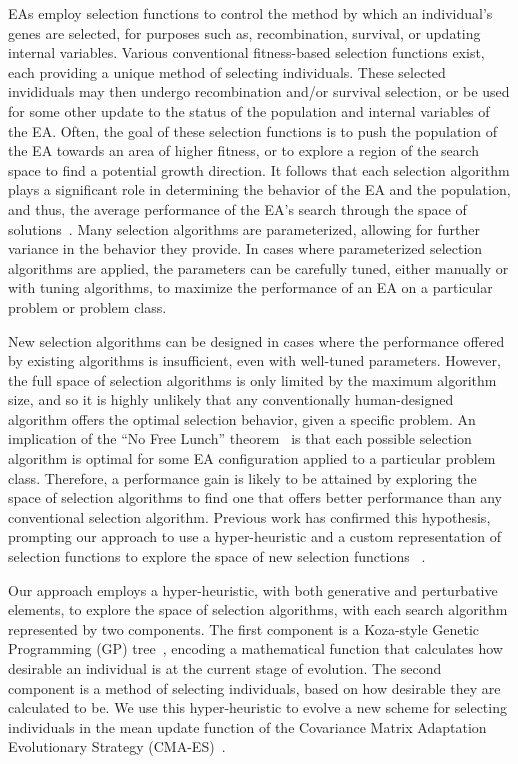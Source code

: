 \documentclass[sigconf]{acmart}
\begin{document}
EAs employ selection functions to control the method by which an individual's genes are selected, for purposes such as, recombination, survival, or updating internal variables. Various conventional fitness-based selection functions exist, each providing a unique method of selecting individuals. These selected invididuals may then undergo recombination and/or survival selection, or be used for some other update to the status of the population and internal variables of the EA. Often, the goal of these selection functions is to push the population of the EA towards an area of higher fitness, or to explore a region of the search space to find a potential growth direction. It follows that each selection algorithm plays a significant role in determining the behavior of the EA and the population, and thus, the average performance of the EA's search through the space of solutions~\citep{woodward2010metaBias}. Many selection algorithms are parameterized, allowing for further variance in the behavior they provide. In cases where parameterized selection algorithms are applied, the parameters can be carefully tuned, either manually or with tuning algorithms, to maximize the performance of an EA on a particular problem or problem class.

New selection algorithms can be designed in cases where the performance offered by existing algorithms is insufficient, even with well-tuned parameters. However, the full space of selection algorithms is only limited by the maximum algorithm size, and so it is highly unlikely that any conventionally human-designed algorithm offers the optimal selection behavior, given a specific problem. An implication of the ``No Free Lunch'' theorem~\citep{wolpert1995noFreeLunch} is that each possible selection algorithm is optimal for some EA configuration applied to a particular problem class. Therefore, a performance gain is likely to be attained by exploring the space of selection algorithms to find one that offers better performance than any conventional selection algorithm. Previous work has confirmed this hypothesis, prompting our approach to use a hyper-heuristic and a custom representation of selection functions to explore the space of new selection functions ~\citep{woodward2011selection}.

Our approach employs a hyper-heuristic, with both generative and perturbative elements, to explore the space of selection algorithms, with each search algorithm represented by two components. The first component is a Koza-style Genetic Programming (GP) tree~\citep{koza1994genetic}, encoding a mathematical function that calculates how desirable an individual is at the current stage of evolution. The second component is a method of selecting individuals, based on how desirable they are calculated to be. We use this hyper-heuristic to evolve a new scheme for selecting individuals in the mean update function of the Covariance Matrix Adaptation Evolutionary Strategy (CMA-ES)~\citep{hansen1996cmaes}.  
\end{document}
